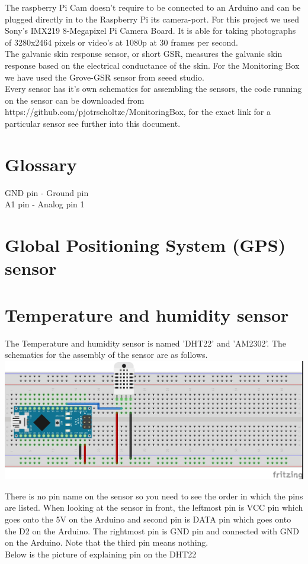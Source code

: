 \documentclass{report}
\begin{document}
The raspberry Pi Cam doesn't require to be connected to an Arduino and can be plugged directly in to the Raspberry Pi its camera-port. For this project we used Sony's IMX219 8-Megapixel Pi Camera Board. It is able for taking photographs of 3280x2464 pixels or video's at 1080p at 30 frames per second. \\

The galvanic skin response sensor, or short GSR, measures the galvanic skin response based on the electrical conductance of the skin. For the Monitoring Box we have used the Grove-GSR sensor from seeed studio.\\

Every sensor has it's own schematics for assembling the sensors, the code running on the sensor can be downloaded from https://github.com/pjotrscholtze/MonitoringBox, for the exact link for a particular sensor see further into this document.  


\chapter{Glossary}

GND pin - Ground pin \\
A1 pin - Analog pin 1


\chapter{Global Positioning System (GPS) sensor}

\chapter{Temperature and humidity sensor}
The Temperature and humidity sensor is named 'DHT22' and 'AM2302'. The schematics for the assembly of the sensor are as follows.\\

\includegraphics[scale=0.5]{images/Humi.jpg}

There is no pin name on the sensor so you need to see the order in which the pins are listed. When looking at the sensor in front, the leftmost pin is VCC pin which goes onto the 5V on the Arduino and second pin is DATA pin which goes onto the D2 on the Arduino. The rightmost pin is GND pin and connected with GND on the Arduino. Note that the third pin means nothing. \\
Below is the picture of explaining pin on the DHT22 \\
\end{document}
